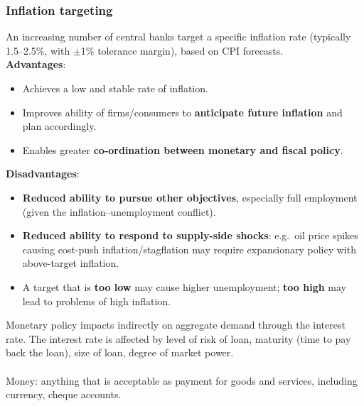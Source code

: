 \subsubsection*{Inflation targeting}
An increasing number of central banks target a specific inflation rate (typically 1.5--2.5\%, with $\pm$1\% tolerance margin), based on CPI forecasts.\\
\textbf{Advantages}:
\begin{itemize}
  \item Achieves a low and stable rate of inflation.
  \item Improves ability of firms/consumers to \textbf{anticipate future inflation} and plan accordingly.
  \item Enables greater \textbf{co-ordination between monetary and fiscal policy}.
\end{itemize}
\textbf{Disadvantages}:
\begin{itemize}
  \item \textbf{Reduced ability to pursue other objectives}, especially full employment (given the inflation--unemployment conflict).
  \item \textbf{Reduced ability to respond to supply-side shocks}: e.g.\ oil price spikes causing cost-push inflation/stagflation may require expansionary policy with above-target inflation.
  \item A target that is \textbf{too low} may cause higher unemployment; \textbf{too high} may lead to problems of high inflation.
\end{itemize}
Monetary policy impacts indirectly on aggregate demand through the interest rate. The interest rate is affected by level of risk of loan, maturity (time to pay back the loan), size of loan, degree of market power.\\\\
Money: anything that is acceptable as payment for goods and services, including currency, cheque accounts.

